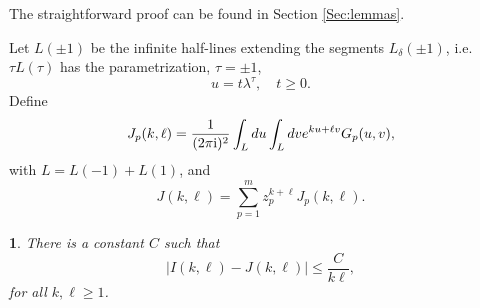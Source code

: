 \documentclass{article}
\numberwithin{equation}{section}
\numberwithin{figure}{section}
\theoremstyle{plain}
\theoremstyle{plain}
\newtheorem{lemma}[thm]{\protect\lemmaname}
\numberwithin{thm}{section}
\theoremstyle{remark}
\providecommand{\lemmaname}{Lemma}
\newcommand{\I}{{\rm i}}
\let \le \leqslant
\let \ge \geqslant
\begin{document}
The straightforward proof can be found in Section \ref{Sec:lemmas}.

Let $L(\pm 1)$ be the infinite half-lines extending the segments $L_\delta(\pm 1)$, i.e. $\tau L(\tau)$ has the parametrization, $\tau=\pm1$,
\begin{equation}\label{Lparinf}
u=t\lambda^\tau, \quad t\ge 0.
\end{equation}
Define
\begin{equation}\label{Jpkl}
J_p(k,\ell)=\frac 1{(2\pi\I)^2}\int_{L}du\int_{L}dv e^{ku+\ell v}G_p(u,v),
\end{equation}
with $L=L(-1)+L(1)$, and
\begin{equation}\label{Jkl}
J(k,\ell)=\sum_{p=1}^m z_p^{k+\ell}J_p(k,\ell).
\end{equation}

\begin{lemma}\label{Lem:JklIkl}
There is a constant $C$ such that
\begin{equation}\label{JklIkl}
|I(k,\ell)-J(k,\ell)|\le\frac{C}{k\ell},
\end{equation}
for all $k,\ell\ge 1$.
\end{lemma}
\end{document}

